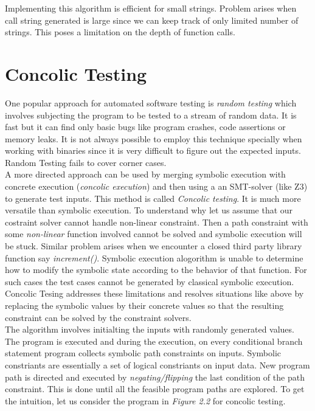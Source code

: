 \documentclass[12pt,oneside]{book}
\begin{document}
Implementing this algorithm is efficient for small strings. Problem arises when call string generated is large since we can keep track of only limited number of strings. This poses a limitation on the depth of function calls.



\section {Concolic Testing}

One popular approach for automated software testing is \textit{random testing}\cite{random} which involves subjecting the program to be tested to a stream of random data. It is fast but it can find only basic bugs like program crashes, code assertions or memory leaks. It is not always possible to employ this technique specially when working with binaries since it is very difficult to figure out the expected inputs. Random Testing fails to cover corner cases.\\

A more directed approach can be used by merging symbolic execution with concrete execution (\textit{concolic execution}\cite{dart}) and then using a an SMT-solver (like Z3\cite{z3}) to generate test inputs. This method is called \textit{Concolic testing}. It is much more versatile than symbolic execution. To understand why let us assume that our costraint solver cannot handle non-linear constraint. Then a path constraint with some \textit{non-linear} function involved cannot be solved and symbolic execution will be stuck. Similar problem arises when we encounter a closed third party library function say \textit{increment()}. Symbolic execution alogorithm is unable to determine how to modify the symbolic state according to the behavior of that function. For such cases the test cases cannot be generated by classical symbolic execution\cite{decadeslater}. Concolic Tesing addresses these limitations and resolves situations like above by replacing the symbolic values by their concrete values so that the resulting constraint can be solved by the constraint solvers.\\

The algorithm involves initialting the inputs with randomly generated values. The program is executed and during the execution, on every conditional branch statement program collects symbolic path constraints on inputs. Symbolic constriants are essentially a set of logical constriants on input data. New program path is directed and executed by \textit{negating/flipping} the last condition of the path constraint. This is done until all the feasible program paths are explored. To get the intuition, let us consider the program in \textit{Figure 2.2} for concolic testing.  
\end{document}
